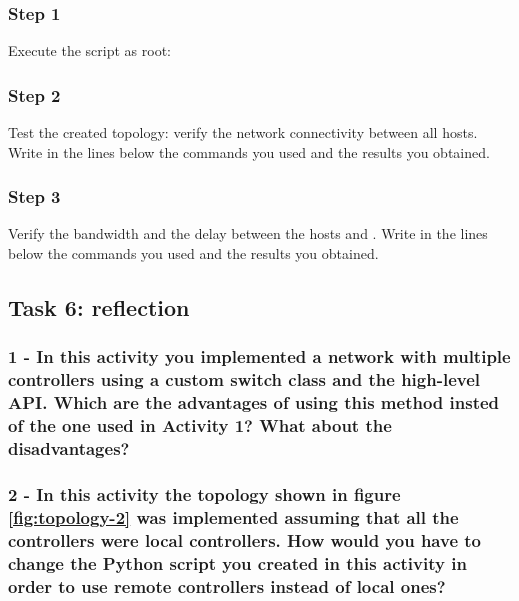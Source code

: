 \subsubsection*{Step 1}
Execute the script as root: \\

\subsubsection*{Step 2}
Test the created topology: verify the network connectivity between all hosts.
Write in the lines below the commands you used and the results you obtained.

\hrulefill

\hrulefill

\hrulefill

\hrulefill

\subsubsection*{Step 3}
Verify the bandwidth and the delay between the hosts  and .
Write in the lines below the commands you used and the results you obtained.

\hrulefill

\hrulefill

\hrulefill

\hrulefill





\subsection*{Task 6: reflection}
\subsubsection*{1 - In this activity you implemented a network with multiple
controllers using a custom switch class and the high-level API. Which are
the advantages of using this method insted of the one used in Activity 1? What
about the disadvantages?}
\hrulefill

\hrulefill

\hrulefill

\hrulefill


\subsubsection*{2 - In this activity the topology shown in figure \ref{fig:topology-2}
was implemented assuming that all the controllers were local controllers. How would
you have to change the Python script you created in this activity in order
to use remote controllers instead of local ones?}
\hrulefill

